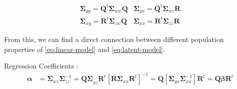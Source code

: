 \documentclass[review]{elsarticle}
\theoremstyle{definition}
\theoremstyle{definition}
\theoremstyle{definition}
\theoremstyle{remark}
\begin{document}
\begin{equation}
  \begin{matrix}
    \boldsymbol{\Sigma}_{yy} = \mathbf{Q}^t \boldsymbol{\Sigma}_{ww} \mathbf{Q} &
    \boldsymbol{\Sigma}_{yx} = \mathbf{Q}^t \boldsymbol{\Sigma}_{wz} \mathbf{R} \\
    \boldsymbol{\Sigma}_{xy} = \mathbf{R}^t \boldsymbol{\Sigma}_{zw} \mathbf{Q} &
    \boldsymbol{\Sigma}_{xx} = \mathbf{R}^t \boldsymbol{\Sigma}_{zz} \mathbf{R}
  \end{matrix}
  \label{eq:cov-yx-wz}
\end{equation}

From this, we can find a direct connection between different population
properties of \eqref{eq:linear-model} and \eqref{eq:latent-model}.

Regression Coefficients : \[
  \begin{aligned}
  \boldsymbol{\alpha} &= \boldsymbol{\Sigma}_{wz} \boldsymbol{\Sigma}_{zz}^{-1}
      = \boldsymbol{Q\Sigma}_{yz}\mathbf{R}^t\left[\boldsymbol{R\Sigma}_{xx}\mathbf{R}^t\right]^{-1}
      = \mathbf{Q}\left[\boldsymbol{\Sigma}_{yx}\boldsymbol{\Sigma}_{xx}^{-1}\right]\mathbf{R}^t
      = \mathbf{Q}\boldsymbol{\beta}\mathbf{R}^t
  \end{aligned}
  \]
\end{document}
